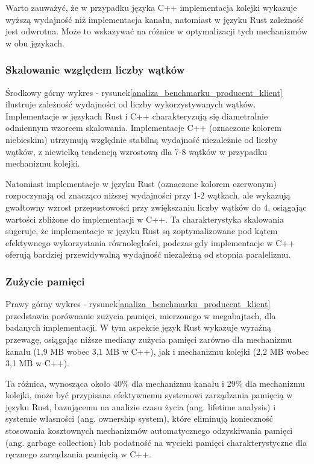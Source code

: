 Warto zauważyć, że w przypadku języka C++ implementacja kolejki wykazuje wyższą wydajność niż implementacja kanału, natomiast w języku Rust zależność jest odwrotna. Może to wskazywać na różnice w optymalizacji tych mechanizmów w obu językach.

\subsubsection{Skalowanie względem liczby wątków}
Środkowy górny wykres - rysunek\ref{analiza_benchmarku_producent_klient} ilustruje zależność wydajności od liczby wykorzystywanych wątków. Implementacje w językach Rust i C++ charakteryzują się diametralnie odmiennym wzorcem skalowania. Implementacje C++ (oznaczone kolorem niebieskim) utrzymują względnie stabilną wydajność niezależnie od liczby wątków, z niewielką tendencją wzrostową dla 7-8 wątków w przypadku mechanizmu kolejki.

Natomiast implementacje w języku Rust (oznaczone kolorem czerwonym) rozpoczynają od znacząco niższej wydajności przy 1-2 wątkach, ale wykazują gwałtowny wzrost przepustowości przy zwiększaniu liczby wątków do 4, osiągając wartości zbliżone do implementacji w C++. Ta charakterystyka skalowania sugeruje, że implementacje w języku Rust są zoptymalizowane pod kątem efektywnego wykorzystania równoległości, podczas gdy implementacje w C++ oferują bardziej przewidywalną wydajność niezależną od stopnia paralelizmu.

\subsubsection{Zużycie pamięci}
Prawy górny wykres - rysunek\ref{analiza_benchmarku_producent_klient} przedstawia porównanie zużycia pamięci, mierzonego w megabajtach, dla badanych implementacji. W tym aspekcie język Rust wykazuje wyraźną przewagę, osiągając niższe mediany zużycia pamięci zarówno dla mechanizmu kanału (1,9 MB wobec 3,1 MB w C++), jak i mechanizmu kolejki (2,2 MB wobec 3,1 MB w C++).

Ta różnica, wynosząca około 40\% dla mechanizmu kanału i 29\% dla mechanizmu kolejki, może być przypisana efektywnemu systemowi zarządzania pamięcią w języku Rust, bazującemu na analizie czasu życia (ang. lifetime analysis) i systemie własności (ang. ownership system), które eliminują konieczność stosowania kosztownych mechanizmów automatycznego odzyskiwania pamięci (ang. garbage collection) lub podatność na wycieki pamięci charakterystyczne dla ręcznego zarządzania pamięcią w C++.

